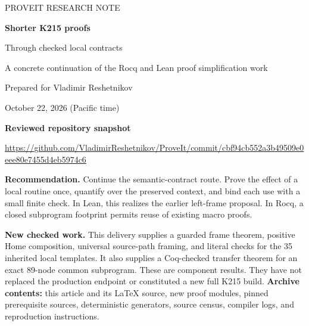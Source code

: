 \documentclass[11pt,letterpaper]{article}
\theoremstyle{definition}\newtheorem{definition}[theorem]{Definition}
\begin{document}
\begin{titlepage}
\vspace*{1cm}
{\Large\textcolor{accent}{PROVEIT RESEARCH NOTE}}\par
\vspace{0.6cm}
{\Huge\bfseries\textcolor{ink}{Shorter K215 proofs}}\par
\vspace{0.3cm}
{\LARGE Through checked local contracts}\par
\vspace{0.8cm}
{\large A concrete continuation of the Rocq and Lean proof simplification work}\par
\vspace{0.8cm}
Prepared for Vladimir Reshetnikov\par
October 22, 2026 (Pacific time)\par
\vspace{0.7cm}
\textbf{Reviewed repository snapshot}\par
\url{https://github.com/VladimirReshetnikov/ProveIt/commit/cbf94cb552a3b49509e0eee80e7455d4eb5974c6}\par
\vspace{0.8cm}
\textbf{Recommendation.} Continue the semantic-contract route. Prove the effect of a local routine once, quantify over the preserved context, and bind each use with a small finite check. In Lean, this realizes the earlier left-frame proposal. In Rocq, a closed subprogram footprint permits reuse of existing macro proofs.

\textbf{New checked work.} This delivery supplies a guarded frame theorem, positive Home composition, universal source-path framing, and literal checks for the 35 inherited local templates. It also supplies a Coq-checked transfer theorem for an exact 89-node common subprogram. These are component results. They have not replaced the production endpoint or constituted a new full K215 build.
\vfill
\textbf{Archive contents:} this article and its LaTeX source, new proof modules, pinned prerequisite sources, deterministic generators, source census, compiler logs, and reproduction instructions.
\end{titlepage}
\end{document}

